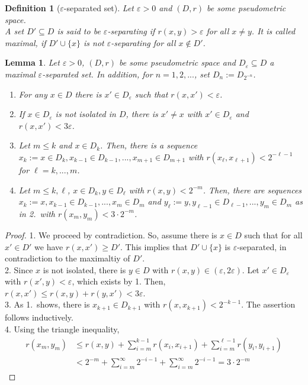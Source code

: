 \documentclass{article}
\newtheorem{lemma}[proposition]{Lemma}
\newtheorem{definition}[proposition]{Definition}
\theoremstyle{definition}
\theoremstyle{step} \newtheorem{step}{Step}
\begin{document}
\begin{definition}[$\varepsilon$-separated set]
  Let $\varepsilon>0$ and $(D,r)$ be some pseudometric space.\\ A set $D' \subseteq D$ is said to be $\varepsilon$-separating if $r(x, y) > \varepsilon$ for all $x\neq y$. It is called maximal, if $D' \cup \{x\}$ is not $\varepsilon$-separating for all $x \notin D'$.
\end{definition}

\begin{lemma}
  Let $\varepsilon>0$, $(D,r)$ be some pseudometric space and $D_\varepsilon \subseteq D$ a maximal $\varepsilon$-separated set. In addition, for $n=1,2,...$, set $D_n := D_{2^{-n}}$.
  \begin{enumerate}
    \item For any $x\in D$ there is $x' \in D_\varepsilon$ such that $r(x,x') < \varepsilon$.
    \item If $x \in D_\varepsilon$ is not isolated in $D$, there is $x' \neq x$ with $x'\in D_\varepsilon$ and $r(x,x') < 3 \varepsilon$.
    \item Let $m\leq k$ and $x \in D_k$. Then, there is a sequence $x_k :=x \in D_k, x_{k-1} \in D_{k-1},...,x_{m+1} \in D_{m+1}$ with $r(x_\ell, x_{\ell+1}) < 2^{-\ell-1}$ for $\ell=k,...,m$.
    \item  Let $m \leq k,\ell$, $x \in D_k, y\in D_\ell$ with $r(x,y) < 2^{-m}$. Then, there are sequences $x_k :=x, x_{k-1} \in D_{k-1},...,x_{m} \in D_{m}$ and $y_\ell :=y, y_{\ell-1} \in D_{\ell-1},...,y_{m} \in D_{m}$ as in 2.\ with $r(x_{m}, y_{m}) < 3\cdot 2^{-m}$.
  \end{enumerate}

\end{lemma}

\begin{proof}
  1. We proceed by contradiction. So, assume there is $x \in D$ such that for all $x' \in D'$ we have $r(x,x') \geq D'$. This implies that $D' \cup \{x\}$ is $\varepsilon$-separated, in contradiction to the maximaltiy of $D'$.
  \\ 2. Since $x$ is not isolated, there is $y \in D$ with $r(x,y) \in (\varepsilon, 2\varepsilon)$. Let $x' \in D_\varepsilon$ with $r(x',y) < \varepsilon$, which exists by 1. Then, $r(x,x') \leq r(x,y) + r(y,x') < 3\varepsilon$.
  \\ 3. As 1.\ shows, there is $x_{k+1} \in D_{k+1}$ with $r(x, x_{k+1}) < 2^{-k-1}$. The assertion follows inductively.
  \\ 4. Using the triangle inequality,
  \begin{align*}
    r(x_{m}, y_{m}) & \leq r(x,y) + \sum_{i=m}^{k-1} r(x_i, x_{i+1}) + \sum_{i=m}^{\ell-1} r(y_i, y_{i+1}) \\ & < 2^{-m} + \sum_{i=m}^\infty 2^{-i-1} + \sum_{i=m}^\infty 2^{-i-1}  = 3\cdot 2^{-m}
  \end{align*}
\end{proof}
\end{document}
